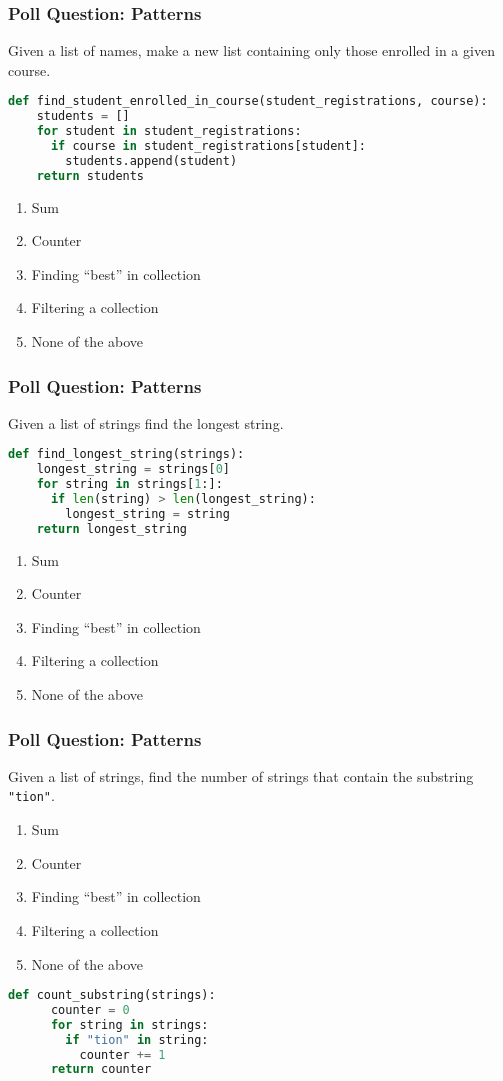 \documentclass{beamer}
\begin{document}
%
%
\begin{frame}[fragile]
  \frametitle{Poll Question: Patterns}
  Given a list of names, make a new list containing only those enrolled in a given course.
  \begin{lstlisting}[language=Python, autogobble]
  def find_student_enrolled_in_course(student_registrations, course):
    students = []
    for student in student_registrations:
      if course in student_registrations[student]:
        students.append(student)
    return students
  \end{lstlisting}
  \begin{enumerate}[A]
    \item Sum
    \item Counter
    \item Finding ``best'' in collection
    \item Filtering a collection
    \item None of the above
  \end{enumerate}
\end{frame}

%
%
\begin{frame}[fragile]
  \frametitle{Poll Question: Patterns}
  Given a list of strings find the longest string.
  \begin{lstlisting}[language=Python, autogobble]
  def find_longest_string(strings):
    longest_string = strings[0]
    for string in strings[1:]:
      if len(string) > len(longest_string):
        longest_string = string
    return longest_string
  \end{lstlisting}
  \vfill
  \begin{enumerate}[A]
    \item Sum
    \item Counter
    \item Finding ``best'' in collection
    \item Filtering a collection
    \item None of the above
  \end{enumerate}
\end{frame}

%
%
\begin{frame}[fragile]
  \frametitle{Poll Question: Patterns}
  Given a list of strings, find the number of strings that contain the substring \lstinline|"tion"|.
  \begin{enumerate}[A]
    \item Sum
    \item Counter
    \item Finding ``best'' in collection
    \item Filtering a collection
    \item None of the above
  \end{enumerate}
  \vfill
  \begin{lstlisting}[language=Python, autogobble]
    def count_substring(strings):
      counter = 0
      for string in strings:
        if "tion" in string:
          counter += 1
      return counter
  \end{lstlisting}
\end{frame}

\begin{frame}
\end{frame}
\end{document}
